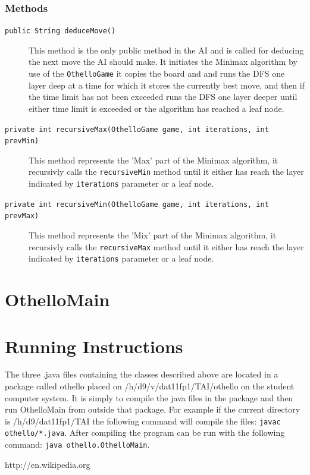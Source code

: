 \documentclass[a4paper]{article}
\begin{document}
\subsubsection{Methods}
\begin{description}
\item[\texttt{public String deduceMove()}] This method is the only public method in the AI and is called for deducing the next move the AI should make. It initiates the Minimax algorithm by use of the \texttt{OthelloGame} it copies the board and and runs the DFS one layer deep at a time for which it stores the currently best move, and then if the time limit has not been exceeded runs the DFS one layer deeper until either time limit is exceeded or the algorithm has reached a leaf node.
\item[\texttt{private int recursiveMax(OthelloGame game, int iterations, int prevMin)}] This method represents the 'Max' part of the Minimax algorithm, it recursivly calls the \texttt{recursiveMin} method until it either has reach the layer indicated by \texttt{iterations} parameter or a leaf node. 
\item[\texttt{private int recursiveMin(OthelloGame game, int iterations, int prevMax)}] This method represents the 'Mix' part of the Minimax algorithm, it recursivly calls the \texttt{recursiveMax} method until it either has reach the layer indicated by \texttt{iterations} parameter or a leaf node. 
\end{description} 


\section{OthelloMain}

\section{Running Instructions}
The three .java files containing the classes described above are located in a package called othello placed on /h/d9/v/dat11fp1/TAI/othello on the student computer system. It is simply to compile the java files in the package and then run OthelloMain from outside that package. For example if the current directory is /h/d9/dat11fp1/TAI the following command will compile the files: \texttt{javac othello/*.java}. After compiling the program can be run with the following command: \texttt{java othello.OthelloMain}.

\begin{thebibliography}{1}
http://en.wikipedia.org
\end{thebibliography}
\end{document}
